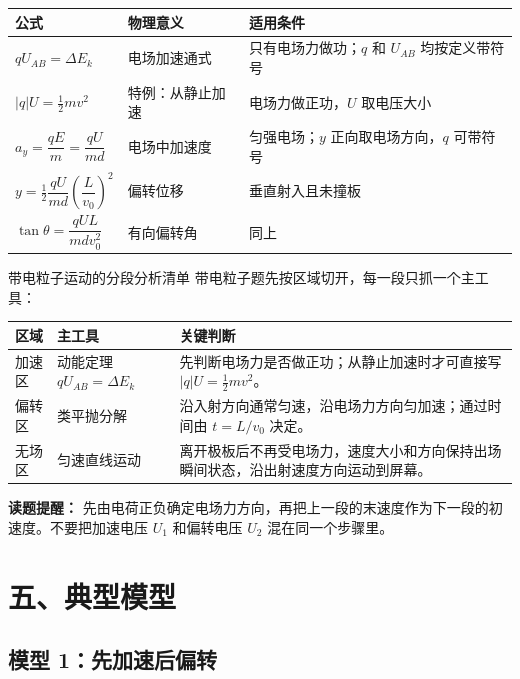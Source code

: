 \begin{center}
\small
\begin{tabular}{>{\centering\arraybackslash}p{}p{}p{}}
\toprule
公式 & 物理意义 & 适用条件 \\
\midrule
$qU_{AB}=\Delta E_k$ & 电场加速通式 & 只有电场力做功；$q$ 和 $U_{AB}$ 均按定义带符号 \\
$\lvert q\rvert U = \frac12 mv^2$ & 特例：从静止加速 & 电场力做正功，$U$ 取电压大小 \\
$a_y = \dfrac{qE}{m} = \dfrac{qU}{md}$ & 电场中加速度 & 匀强电场；$y$ 正向取电场方向，$q$ 可带符号 \\
$y = \frac12 \dfrac{qU}{md}\left(\dfrac{L}{v_0}\right)^2$ & 偏转位移 & 垂直射入且未撞板 \\
$\tan\theta = \dfrac{qUL}{mdv_0^2}$ & 有向偏转角 & 同上 \\
\bottomrule
\end{tabular}
\end{center}

\begin{learningbox}{带电粒子运动的分段分析清单}
带电粒子题先按区域切开，每一段只抓一个主工具：
\begin{center}
\begin{tabular}{p{}p{}p{}}
\toprule
区域 & 主工具 & 关键判断 \\
\midrule
加速区 & 动能定理 $qU_{AB}=\Delta E_k$ & 先判断电场力是否做正功；从静止加速时才可直接写 $\lvert q\rvert U=\frac12mv^2$。 \\
偏转区 & 类平抛分解 & 沿入射方向通常匀速，沿电场力方向匀加速；通过时间由 $t=L/v_0$ 决定。 \\
无场区 & 匀速直线运动 & 离开极板后不再受电场力，速度大小和方向保持出场瞬间状态，沿出射速度方向运动到屏幕。 \\
\bottomrule
\end{tabular}
\end{center}
\textbf{读题提醒：} 先由电荷正负确定电场力方向，再把上一段的末速度作为下一段的初速度。不要把加速电压 $U_1$ 和偏转电压 $U_2$ 混在同一个步骤里。
\end{learningbox}

\section*{五、典型模型}

\subsection*{模型 1：先加速后偏转}

